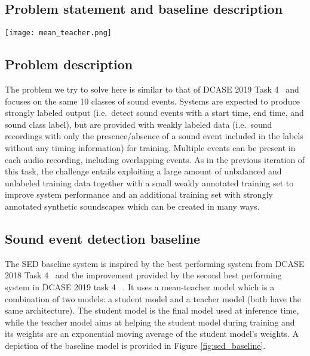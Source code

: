 \documentclass{article}
\begin{document}
\begin{sloppy}
\section{Problem statement and baseline description}
\begin{figure*}
 \texttt{[image: mean\_teacher.png]}
 \caption{Mean-teacher model.  and  represent noise applied to the different models (in this case dropout).}
\label{fig:sed_baseline}
\end{figure*}
\label{sec:pb}
\subsection{Problem description}

The problem we try to solve here is similar to that of DCASE 2019 Task 4~\cite{turpault_2019} and focuses on the same 10 classes of sound events. Systems are expected to produce strongly labeled output (i.e.~detect sound events with a start time, end time, and sound class label), but are provided with weakly labeled data (i.e.~sound recordings with only the presence/absence of a sound event included in the labels without any timing information) for training.
Multiple events can be present in each audio recording, including overlapping events. As in the previous iteration of this task, the challenge entails exploiting a large amount of unbalanced and unlabeled training data together with a small weakly annotated training set to improve system performance and an additional training set with strongly annotated synthetic soundscapes which can be created in many ways.

\subsection{Sound event detection baseline}
\label{sub:sed_baseline}

The SED baseline system is inspired by the best performing system from DCASE 2018 Task 4~\cite{Lu2018} and the improvement provided by the second best performing system in DCASE 2019 task 4~\cite{Delphin-Poulat2019} . It uses a mean-teacher model which is a combination of two models: a student model and a teacher model (both have the same architecture). The student model is the final model used at inference time, while the teacher model aims at helping the student model during training and its weights are an exponential moving average of the student model's weights. A depiction of the baseline model is provided in Figure \ref{fig:sed_baseline}.


\end{sloppy}
\end{document}
